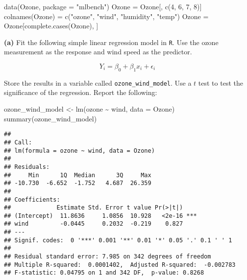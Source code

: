 \documentclass[
]{article}
\newenvironment{Shaded}{\begin{snugshade}}{\end{snugshade}}
\newcommand{\AttributeTok}[1]{\textcolor[rgb]{0.77,0.63,0.00}{#1}}
\newcommand{\DecValTok}[1]{\textcolor[rgb]{0.00,0.00,0.81}{#1}}
\newcommand{\FunctionTok}[1]{\textcolor[rgb]{0.00,0.00,0.00}{#1}}
\newcommand{\NormalTok}[1]{#1}
\newcommand{\OtherTok}[1]{\textcolor[rgb]{0.56,0.35,0.01}{#1}}
\newcommand{\SpecialCharTok}[1]{\textcolor[rgb]{0.00,0.00,0.00}{#1}}
\newcommand{\StringTok}[1]{\textcolor[rgb]{0.31,0.60,0.02}{#1}}
\begin{document}
\begin{Shaded}
\begin{Highlighting}[]
\FunctionTok{data}\NormalTok{(Ozone, }\AttributeTok{package =} \StringTok{"mlbench"}\NormalTok{)}
\NormalTok{Ozone }\OtherTok{=}\NormalTok{ Ozone[, }\FunctionTok{c}\NormalTok{(}\DecValTok{4}\NormalTok{, }\DecValTok{6}\NormalTok{, }\DecValTok{7}\NormalTok{, }\DecValTok{8}\NormalTok{)]}
\FunctionTok{colnames}\NormalTok{(Ozone) }\OtherTok{=} \FunctionTok{c}\NormalTok{(}\StringTok{"ozone"}\NormalTok{, }\StringTok{"wind"}\NormalTok{, }\StringTok{"humidity"}\NormalTok{, }\StringTok{"temp"}\NormalTok{)}
\NormalTok{Ozone }\OtherTok{=}\NormalTok{ Ozone[}\FunctionTok{complete.cases}\NormalTok{(Ozone), ]}
\end{Highlighting}
\end{Shaded}

\textbf{(a)} Fit the following simple linear regression model in
\texttt{R}. Use the ozone measurement as the response and wind speed as
the predictor.

\[
Y_i = \beta_0 + \beta_1 x_i + \epsilon_i
\]

Store the results in a variable called \texttt{ozone\_wind\_model}. Use
a \(t\) test to test the significance of the regression. Report the
following:

\begin{Shaded}
\begin{Highlighting}[]
\NormalTok{ozone\_wind\_model }\OtherTok{\textless{}{-}} \FunctionTok{lm}\NormalTok{(ozone }\SpecialCharTok{\textasciitilde{}}\NormalTok{ wind, }\AttributeTok{data =}\NormalTok{ Ozone)}
\FunctionTok{summary}\NormalTok{(ozone\_wind\_model)}
\end{Highlighting}
\end{Shaded}

\begin{verbatim}
## 
## Call:
## lm(formula = ozone ~ wind, data = Ozone)
## 
## Residuals:
##     Min      1Q  Median      3Q     Max 
## -10.730  -6.652  -1.752   4.687  26.359 
## 
## Coefficients:
##             Estimate Std. Error t value Pr(>|t|)    
## (Intercept)  11.8636     1.0856  10.928   <2e-16 ***
## wind         -0.0445     0.2032  -0.219    0.827    
## ---
## Signif. codes:  0 '***' 0.001 '**' 0.01 '*' 0.05 '.' 0.1 ' ' 1
## 
## Residual standard error: 7.985 on 342 degrees of freedom
## Multiple R-squared:  0.0001402,  Adjusted R-squared:  -0.002783 
## F-statistic: 0.04795 on 1 and 342 DF,  p-value: 0.8268
\end{verbatim}
\end{document}
